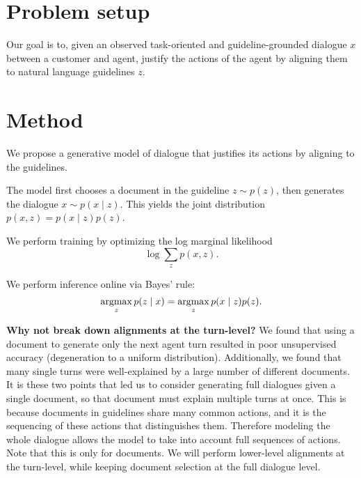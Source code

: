 \documentclass[11pt]{article}
\begin{document}
\section{Problem setup}
Our goal is to, given an observed task-oriented and guideline-grounded dialogue $x$
between a customer and agent,
justify the actions of the agent by aligning them to natural language guidelines $z$.

\section{Method}
We propose a generative model of dialogue that justifies its actions by
aligning to the guidelines.

The model first chooses a document in the guideline $z \sim p(z)$,
then generates the dialogue $x \sim p(x \mid z)$.
This yields the joint distribution $p(x,z) = p(x\mid z)p(z)$.

We perform training by optimizing the log marginal likelihood
\begin{equation}
\log\sum_z p(x,z).
\end{equation}

We perform inference online via Bayes' rule:
\begin{equation}
\operatorname*{argmax}_z p(z\mid x) = \operatorname*{argmax}_zp(x\mid z)p(z).
\end{equation}

\textbf{Why not break down alignments at the turn-level?}
We found that using a document to generate only the next agent turn resulted in poor
unsupervised accuracy (degeneration to a uniform distribution).
Additionally, we found that many single turns were well-explained by a large number of different
documents.
It is these two points that led us to consider generating full dialogues given a single document,
so that document must explain multiple turns at once.
This is because documents in guidelines share many common actions,
and it is the sequencing of these actions that distinguishes them.
Therefore modeling the whole dialogue allows the model to take into account full
sequences of actions.
Note that this is only for documents. We will perform lower-level alignments at
the turn-level, while keeping document selection at the full dialogue level.
\end{document}
